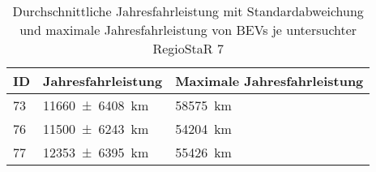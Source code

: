 {
\renewcommand{\arraystretch}{1.2}%
\begin{table}[H]
	\begin{center}
		\caption{Durchschnittliche Jahresfahrleistung mit Standardabweichung und maximale Jahresfahrleistung von BEVs je untersuchter RegioStaR 7}
		\begin{tabu} to 0.65\textwidth {X[0.2] X[1, r] X[1.55, r]}
			\toprule
			ID 	   				   & Jahresfahrleistung                  & Maximale Jahresfahrleistung \\ \midrule
			\num{73}               & \SI[separate-uncertainty = true]{11660(6408)}{\km} & \SI{58575}{\km}             \\
			\num{76}               & \SI[separate-uncertainty = true]{11500(6243)}{\km} & \SI{54204}{\km}             \\
			\num{77}               & \SI[separate-uncertainty = true]{12353(6395)}{\km} & \SI{55426}{\km}             \\ \bottomrule
		\end{tabu}
		\label{tab:bev_distance}
	\end{center}
	\vspace{-3mm}%
\end{table}
}